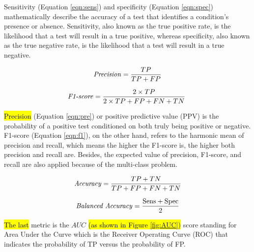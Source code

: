 \documentclass[sensors,article,accept,pdftex,moreauthors]{Definitions/mdpi}
\begin{document}
	{{Sensitivity (Equation \mbox{\eqref{eqn:sens}}) and specificity (Equation \mbox{\eqref{eqn:spec}}) mathematically describe the accuracy of a test that identifies a condition's presence or absence. Sensitivity, also known as the true positive rate, is the likelihood that a test will result in a true positive, whereas specificity, also known as the true negative rate, is the likelihood that a test will result in a true negative.}}
	
	\begin{equation}
		\label{eqn:pre}
		\text{\textit{Precision}} = \frac{TP}{TP + FP}
	\end{equation}
	
	\begin{equation}
		\label{eqn:f1}
		\text{\textit{F1-score}} = \frac{2 \times TP}{2 \times TP + FP + FN + TN}\
	\end{equation}
	
	\hl{Precision} %
 (Equation \eqref{eqn:pre}) or positive predictive value (PPV) is the probability of a positive test conditioned on both truly being positive or negative. F1-score (Equation \eqref{eqn:f1}), on the other hand, refers to the harmonic mean of precision and recall, which means the higher the F1-score is, the higher both precision and recall are. Besides, the expected value of precision, F1-score, and recall are also applied because of the multi-class problem.
	
	\begin{equation}
		\label{eqn:acc}
		\text{\textit{Accuracy}} = \frac{TP + TN}{TP + FP + FN + TN}
	\end{equation}
	
	\begin{equation}
		\label{eqn:balacc}
		\text{\textit{Balanced Accuracy}} = \frac{\text{Sens} + \text{Spec}}{2}
	\end{equation}
	
	\hl{The last} %
 metric is the $AUC$ \hl{(as shown in Figure \mbox{\ref{fig:AUC}})} score standing for Area Under the Curve which is the Receiver Operating Curve (ROC) that indicates the probability of TP versus the probability of FP.  
	
\end{document}

